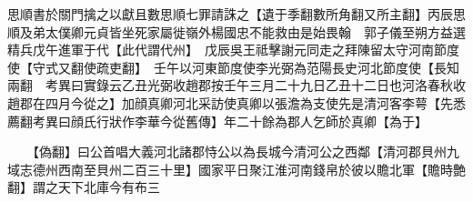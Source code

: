 思順書於關門擒之以獻且數思順七罪請誅之【遺于季翻數所角翻又所主翻】丙辰思順及弟太僕卿元貞皆坐死家屬徙嶺外楊國忠不能救由是始畏翰　郭子儀至朔方益選精兵戊午進軍于代【此代謂代州】　戊辰吳王祗擊謝元同走之拜陳留太守河南節度使【守式又翻使疏吏翻】　壬午以河東節度使李光弼為范陽長史河北節度使【長知兩翻　考異曰實錄云乙丑光弼收趙郡按壬午三月二十九日乙丑十二日也河洛春秋收趙郡在四月今從之】加顔真卿河北采訪使真卿以張澹為支使先是清河客李萼【先悉薦翻考異曰顔氏行狀作李華今從舊傳】年二十餘為郡人乞師於真卿【為于】

　　【偽翻】曰公首唱大義河北諸郡恃公以為長城今清河公之西鄰【清河郡貝州九域志德州西南至貝州二百三十里】國家平日聚江淮河南錢帛於彼以贍北軍【贍時艶翻】謂之天下北庫今有布三